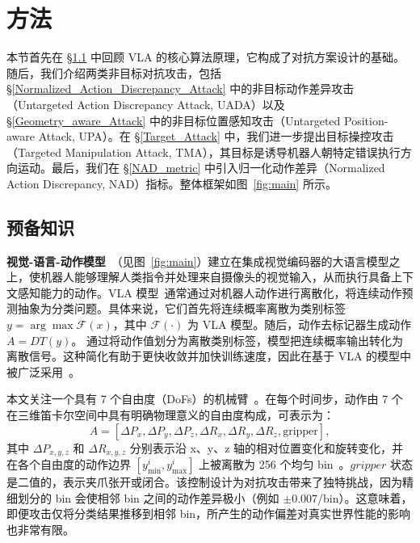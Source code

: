 \section{方法}

\label{sec:method}
本节首先在 \S\ref{preliminary} 中回顾 VLA 的核心算法原理，它构成了对抗方案设计的基础。随后，我们介绍两类非目标对抗攻击，包括 \S\ref{Normalized_Action_Discrepancy_Attack} 中的非目标动作差异攻击（Untargeted Action Discrepancy Attack, UADA）以及 \S\ref{Geometry_aware_Attack} 中的非目标位置感知攻击（Untargeted Position-aware Attack, UPA）。在 \S\ref{Target_Attack} 中，我们进一步提出目标操控攻击（Targeted Manipulation Attack, TMA），其目标是诱导机器人朝特定错误执行方向运动。最后，我们在 \S\ref{NAD_metric} 中引入归一化动作差异（Normalized Action Discrepancy, NAD）指标。整体框架如图~\ref{fig:main} 所示。

\subsection{预备知识} \label{preliminary}
\textbf{视觉-语言-动作模型}~\cite{Brianna2023RT2,kim24openvla}（见图~\ref{fig:main}）建立在集成视觉编码器的大语言模型之上，使机器人能够理解人类指令并处理来自摄像头的视觉输入，从而执行具备上下文感知能力的动作。VLA 模型~\cite{kim24openvla,Brianna2023RT2,Li2024LLaRA}通常通过对机器人动作进行离散化，将连续动作预测抽象为分类问题。具体来说，它们首先将连续概率离散为类别标签 $y = \arg \max \mathcal{F}(x)$，其中 $\mathcal{F}(\cdot)$ 为 VLA 模型。随后，动作去标记器生成动作 $A=DT(y)$。
通过将动作值划分为离散类别标签，模型把连续概率输出转化为离散信号。这种简化有助于更快收敛并加快训练速度，因此在基于 VLA 的模型中被广泛采用~\cite{kim24openvla,Brianna2023RT2,Li2024LLaRA}。

本文关注一个具有 7 个自由度（DoFs）的机械臂~\cite{haddadin2022franka}。在每个时间步，动作由 7 个在三维笛卡尔空间中具有明确物理意义的自由度构成，可表示为：
\begin{equation}
    A=[\Delta{P_x}, \Delta{P_y}, \Delta{P_z}, \Delta{R_x}, \Delta{R_y}, \Delta{R_z}, \text{gripper}],
\end{equation}
其中 $\Delta{P_{x,y,z}}$ 和 $\Delta{R_{x,y,z}}$ 分别表示沿 x、y、z 轴的相对位置变化和旋转变化，并在各个自由度的动作边界 $[y_{\min}^i,y_{\max}^i]$ 上被离散为 256 个均匀 bin~\cite{kim24openvla}。$gripper$ 状态是二值的，表示夹爪张开或闭合。该控制设计为对抗攻击带来了独特挑战，因为精细划分的 bin 会使相邻 bin 之间的动作差异极小（例如 $\pm$0.007/bin）。这意味着，即便攻击仅将分类结果推移到相邻 bin，所产生的动作偏差对真实世界性能的影响也非常有限。


